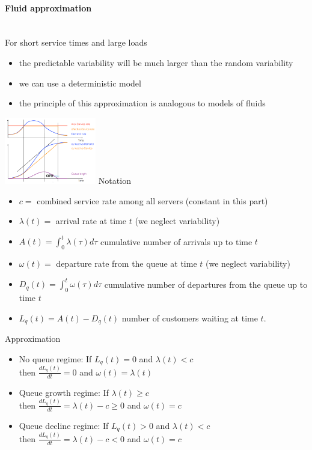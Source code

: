 \documentclass[paper=a4,fontsize=8pt,pagesize,DIV=calc]{scrartcl}
\newcounter{row}
\begin{document}
\begin{multicols}{3}
\paragraph{Fluid approximation}~~\\
For short service times and large loads
\begin{itemize}
\item the predictable variability will be much larger than the random variability
\item we can use a deterministic model
\item the principle of this approximation is analogous to models of fluids
\end{itemize}
\includegraphics[width=0.3\textwidth]{fluid}
Notation
\begin{itemize}
\item $c =$ combined service rate among all servers (constant in this part)
\item $\lambda(t) =$ arrival rate at time $t$ (we neglect variability)
\item $A(t) =\int_0^t \lambda(\tau) d\tau$ cumulative number of arrivals up to time $t$
\item $\omega(t) =$ departure rate from the queue at time $t$ (we neglect variability)
\item $D_q(t)=\int_0^t \omega(\tau)d\tau$ cumulative number of departures from the queue up to time $t$
\item $ L_q(t) = A(t) - D_q(t)$ number of customers waiting at time $t$.
\end{itemize}
Approximation
\begin{itemize}
\item No queue regime: If $L_q(t) = 0$ and $\lambda(t) < c$ \\ then $\frac{dL_q(t)}{dt} = 0$ and $\omega(t)=\lambda(t)$
\item Queue growth regime: If $\lambda(t)\geq c$ \\ then $\frac{dL_q(t)}{dt} = \lambda(t)-c\geq  0$ and $\omega(t) = c$
\item Queue decline regime: If $L_q(t) > 0$ and $\lambda(t) < c$ \\ then 
$\frac{dL_q(t)}{dt} = \lambda(t) - c < 0$ and $\omega(t) = c$
\end{itemize}

\end{multicols}
\end{document}
